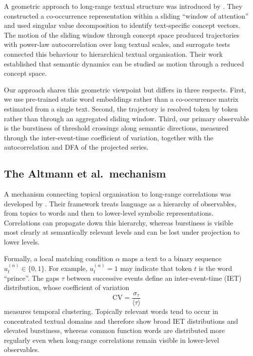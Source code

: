 \documentclass[12pt,a4paper]{article}
\newcommand{\meantau}{\langle\tau\rangle}
\newcommand{\sigmatau}{\sigma_\tau}
\newcommand{\CV}{\mathrm{CV}}
\begin{document}
A geometric approach to long-range textual structure was introduced by
\citet{AlvarezLacalle2006}.
They constructed a co-occurrence representation within a sliding
``window of attention'' and used singular value decomposition to identify
text-specific concept vectors.
The motion of the sliding window through concept space produced
trajectories with power-law autocorrelation over long textual scales, and
surrogate tests connected this behaviour to hierarchical textual
organisation.
Their work established that semantic dynamics can be studied as motion
through a reduced concept space.

Our approach shares this geometric viewpoint but differs in three
respects.
First, we use pre-trained static word embeddings rather than a
co-occurrence matrix estimated from a single text.
Second, the trajectory is resolved token by token rather than through an
aggregated sliding window.
Third, our primary observable is the burstiness of threshold crossings
along semantic directions, measured through the inter-event-time
coefficient of variation, together with the autocorrelation and DFA of
the projected series.

\subsection{The Altmann et al.\ mechanism}

A mechanism connecting topical organisation to long-range correlations
was developed by \citet{Altmann2012}.
Their framework treats language as a hierarchy of observables, from
topics to words and then to lower-level symbolic representations.
Correlations can propagate down this hierarchy, whereas burstiness is
visible most clearly at semantically relevant levels and can be lost
under projection to lower levels.

Formally, a local matching condition $\alpha$ maps a text to a binary
sequence $u_t^{(\alpha)}\in\{0,1\}$.
For example, $u_t^{(\alpha)}=1$ may indicate that token $t$ is the word
``prince''.
The gaps $\tau$ between successive events define an inter-event-time
(IET) distribution, whose coefficient of variation
\begin{equation}
  \CV=\frac{\sigmatau}{\meantau}
\end{equation}
measures temporal clustering.
Topically relevant words tend to occur in concentrated textual domains
and therefore show broad IET distributions and elevated burstiness,
whereas common function words are distributed more regularly even when
long-range correlations remain visible in lower-level observables.
\end{document}
